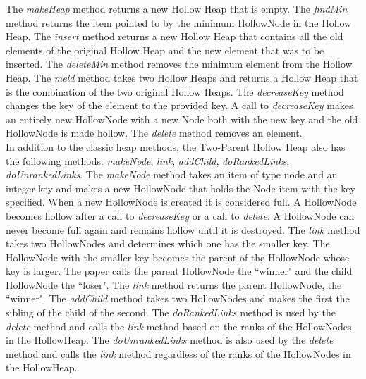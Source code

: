 \documentclass[letter,10pt]{article}
\begin{document}
The \textit{makeHeap} method returns a new Hollow Heap that is empty. The \textit{findMin} method returns the item pointed to by the minimum HollowNode in the Hollow Heap. The \textit{insert} method returns a new Hollow Heap that contains all the old elements of the original Hollow Heap and the new element that was to be inserted. The \textit{deleteMin} method removes the minimum element from the Hollow Heap. The \textit{meld} method takes two Hollow Heaps and returns a Hollow Heap that is the combination of the two original Hollow Heaps. The \textit{decreaseKey} method changes the key of the element to the provided key. A call to \textit{decreaseKey} makes an entirely new HollowNode with a new Node both with the new key and the old HollowNode is made hollow. The \textit{delete} method removes an element.\\ 

In addition to the classic heap methods, the Two-Parent Hollow Heap also has the following methods: \textit{makeNode}, \textit{link}, \textit{addChild}, \textit{doRankedLinks}, \textit{doUnrankedLinks}. The \textit{makeNode} method takes an item of type node and an integer key and makes a new HollowNode that holds the Node item with the key specified. When a new HollowNode is created it is considered full.  A HollowNode becomes hollow after a call to \textit{decreaseKey} or a call to \textit{delete}. A HollowNode can never become full again and remains hollow until it is destroyed. The \textit{link} method takes two HollowNodes and determines which one has the smaller key. The HollowNode with the smaller key becomes the parent of the HollowNode whose key is larger. The paper calls the parent HollowNode the ``winner" and the child HollowNode the ``loser". The \textit{link} method returns the parent HollowNode, the ``winner". The \textit{addChild} method takes two HollowNodes and makes the first the sibling of the child of the second. The \textit{doRankedLinks} method is used by the \textit{delete} method and calls the \textit{link} method based on the ranks of the HollowNodes in the HollowHeap. The \textit{doUnrankedLinks} method is also used by the \textit{delete} method and calls the \textit{link} method regardless of the ranks of the HollowNodes in the HollowHeap. 
\end{document}
